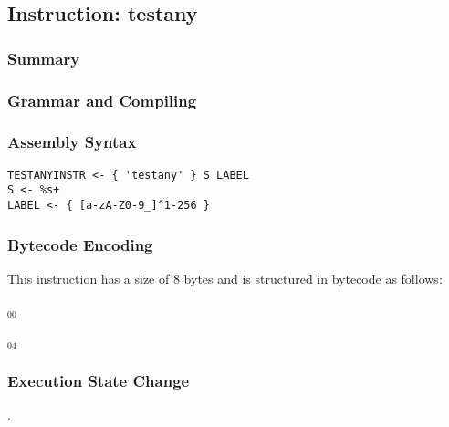 \subsection{Instruction: testany}

\subsubsection{Summary}


\subsubsection{Grammar and Compiling}


\subsubsection{Assembly Syntax}

\begin{myquote}
\begin{verbatim}
TESTANYINSTR <- { 'testany' } S LABEL
S <- %s+
LABEL <- { [a-zA-Z0-9_]^1-256 }
\end{verbatim}
\end{myquote}

\subsubsection{Bytecode Encoding}

This instruction has a size of 8 bytes and is structured in bytecode as follows:

$_{00}$\ 



$_{04}$\ 


\subsubsection{Execution State Change}

.


